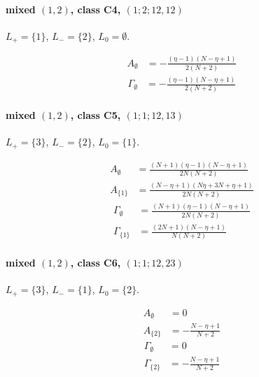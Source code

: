 \documentclass[11pt]{article}
\begin{document}
\paragraph{mixed $(1,2)$, class C4, $(1;2;12,12)$}

$L_+=\{1\}$, $L_-=\{2\}$, $L_0=\emptyset$.

\begin{align*}
  A_{\emptyset} &= - \frac{\left(\eta - 1\right) \left(N - \eta + 1\right)}{2 \left(N + 2\right)} 
\end{align*}
\begin{align*}
  \Gamma_{\emptyset} &= - \frac{\left(\eta - 1\right) \left(N - \eta + 1\right)}{2 \left(N + 2\right)} 
\end{align*}

\paragraph{mixed $(1,2)$, class C5, $(1;1;12,13)$}

$L_+=\{3\}$, $L_-=\{2\}$, $L_0=\{1\}$.

\begin{align*}
  A_{\emptyset} &= \frac{\left(N + 1\right) \left(\eta - 1\right) \left(N - \eta + 1\right)}{2 N \left(N + 2\right)} \\
  A_{\{1\}} &= \frac{\left(N - \eta + 1\right) \left(N \eta + 3 N + \eta + 1\right)}{2 N \left(N + 2\right)} 
\end{align*}
\begin{align*}
  \Gamma_{\emptyset} &= \frac{\left(N + 1\right) \left(\eta - 1\right) \left(N - \eta + 1\right)}{2 N \left(N + 2\right)} \\
  \Gamma_{\{1\}} &= \frac{\left(2 N + 1\right) \left(N - \eta + 1\right)}{N \left(N + 2\right)} 
\end{align*}

\paragraph{mixed $(1,2)$, class C6, $(1;1;12,23)$}

$L_+=\{3\}$, $L_-=\{1\}$, $L_0=\{2\}$.

\begin{align*}
  A_{\emptyset} &= 0 \\
  A_{\{2\}} &= - \frac{N - \eta + 1}{N + 2} 
\end{align*}
\begin{align*}
  \Gamma_{\emptyset} &= 0 \\
  \Gamma_{\{2\}} &= - \frac{N - \eta + 1}{N + 2} 
\end{align*}
\end{document}
